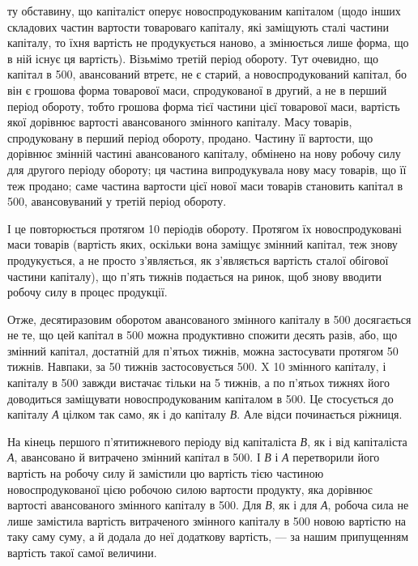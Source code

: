 \parcont{}  %
ту обставину, що капіталіст оперує новоспродукованим капіталом (щодо
інших складових частин вартости товароваго капіталу, які заміщують
сталі частини капіталу, то їхня вартість не продукується наново, а змінюється
лише форма, що в ній існує ця вартість). Візьмімо третій період
обороту. Тут очевидно, що капітал в 500, авансований втретє,
не є старий, а новоспродукований капітал, бо він є грошова форма
товарової маси, спродукованої в другий, а не в перший період обороту,
тобто грошова форма тієї частини цієї товарової маси, вартість якої
дорівнює вартості авансованого змінного капіталу. Масу товарів, спродуковану
в перший період обороту, продано. Частину її вартости, що дорівнює
змінній частині авансованого капіталу, обмінено на нову робочу
силу для другого періоду обороту; ця частина випродукувала нову масу
товарів, що її теж продано; саме частина вартости цієї нової маси
товарів становить капітал в 500, авансовуваний у третій період
обороту.

І це повторюється протягом 10 періодів обороту. Протягом їх новоспродуковані
маси товарів (вартість яких, оскільки вона заміщує змінний
капітал, теж знову продукується, а не просто з’являється, як з’являється
вартість сталої обігової частини капіталу), що п’ять тижнів подається
на ринок, щоб знову вводити робочу силу в процес продукції.

Отже, десятиразовим оборотом авансованого змінного капіталу в 500 досягається не те, що цей капітал в 500 можна продуктивно
спожити десять разів, або, що змінний капітал, достатній для
п’ятьох тижнів, можна застосувати протягом 50 тижнів. Навпаки, за 50
тижнів застосовується 500. X 10 змінного капіталу, і капіталу в
500 завжди вистачає тільки на 5 тижнів, а по п’ятьох тижнях
його доводиться заміщувати новоспродукованим капіталом в 500.
Це стосується до капіталу \emph{А} цілком так само, як і до капіталу \emph{В}. Але
відси починається ріжниця.

На кінець першого п’ятитижневого періоду від капіталіста \emph{В}, як і
від капіталіста \emph{А}, авансовано й витрачено змінний капітал в 500.
І \emph{В} і \emph{А} перетворили його вартість на робочу силу й замістили цю вартість
тією частиною новоспродукованої цією робочою силою вартости продукту,
яка дорівнює вартості авансованого змінного капіталу в 500. Для
\emph{В}, як і для \emph{А}, робоча сила не лише замістила вартість витраченого змінного
капіталу в 500 новою вартістю на таку саму суму, а й додала
до неї додаткову вартість, — за нашим припущенням вартість такої
самої величини.

